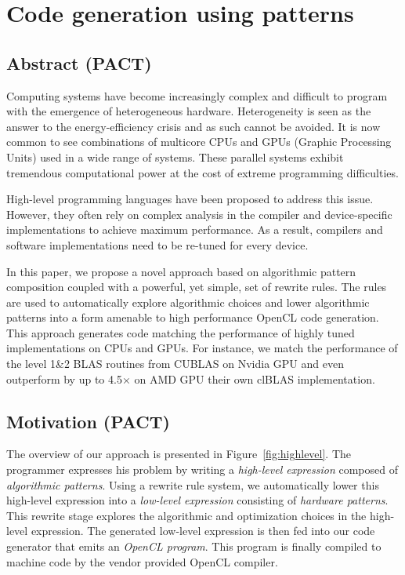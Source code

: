 
\chapter{Code generation using patterns}

\label{ch:fifth} %

\section{Abstract (PACT)}
Computing systems have become increasingly complex and difficult to program with the emergence of heterogeneous hardware.
Heterogeneity is seen as the answer to the energy-efficiency crisis and as such cannot be avoided.
It is now common to see combinations of multicore CPUs and GPUs (Graphic Processing Units) used in a wide range of systems.
These parallel systems exhibit tremendous computational power at the cost of extreme programming difficulties.

High-level programming languages have been proposed to address this issue.
However, they often rely on complex analysis in the compiler and device-specific implementations to achieve maximum performance.
As a result, compilers and software implementations need to be re-tuned for every device.

In this paper, we propose a novel approach based on algorithmic pattern composition coupled with a powerful, yet simple, set of rewrite rules.
The rules are used to automatically explore algorithmic choices and lower algorithmic patterns into a form amenable to high performance OpenCL code generation.
This approach generates code matching the performance of highly tuned implementations on CPUs and GPUs.
For instance, we match the performance of the level 1\&2 BLAS routines from CUBLAS on Nvidia GPU and even outperform by up to 4.5$\times$ on AMD GPU their own clBLAS implementation.

\section{Motivation (PACT)}
The overview of our approach is presented in Figure~\ref{fig:highlevel}.
The programmer expresses his problem by writing a \emph{high-level expression} composed of \emph{algorithmic patterns}.
Using a rewrite rule system, we automatically lower this high-level expression into a \emph{low-level expression} consisting of \emph{hardware patterns}.
This rewrite stage explores the algorithmic and optimization choices in the high-level expression.
The generated low-level expression is then fed into our code generator that emits an \emph{OpenCL program}.
This program is finally compiled to machine code by the vendor provided OpenCL compiler.

